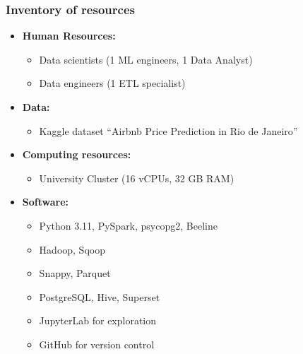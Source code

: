 \subsubsection{Inventory of resources}
\label{sec:inventoryOfResources}
\begin{itemize}
  \item \textbf{Human Resources:}  
    \begin{itemize}
      \item Data scientists (1 ML engineers, 1 Data Analyst)  
      \item Data engineers (1 ETL specialist)
    \end{itemize}
  \item \textbf{Data:}  
    \begin{itemize}
      \item Kaggle dataset “Airbnb Price Prediction in Rio de Janeiro” \cite{airbnb_rio_kaggle}  
    \end{itemize}
  \item \textbf{Computing resources:}  
    \begin{itemize}
      \item University Cluster (16 vCPUs, 32 GB RAM)
    \end{itemize}
  \item \textbf{Software:}  
    \begin{itemize}
      \item Python 3.11, PySpark, psycopg2, Beeline
      \item Hadoop, Sqoop
      \item Snappy, Parquet
      \item PostgreSQL, Hive, Superset
      \item JupyterLab for exploration  
      \item GitHub for version control  
    \end{itemize}
\end{itemize}

